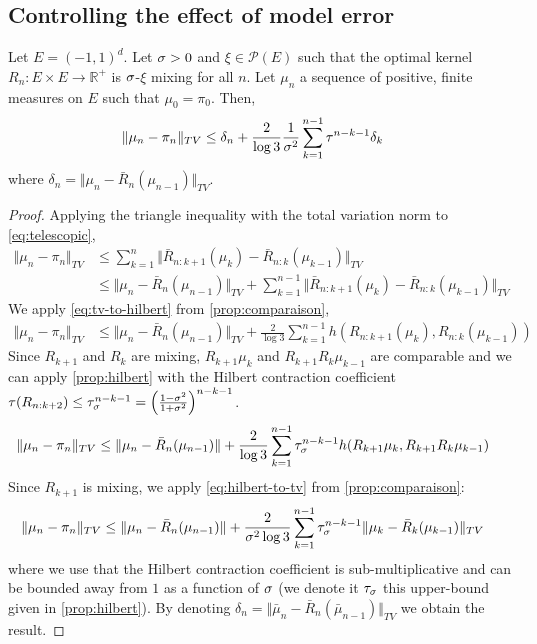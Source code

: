 \subsection{Controlling the effect of model error}\label{sec:proof-bound-model-error}
\begin{proposition}\label{prop:lemma_bound}
    Let $E = (-1, 1)^d$. Let $\sigma>0$ and $\xi\in\mathcal P(E)$ such that the optimal kernel $R_n:E\times E\to \mathbb R^+$ is $\sigma$-$\xi$ mixing for all $n$. Let $\mu_n$ a sequence of positive, finite measures on $E$ such that $\mu_0=\pi_0$. Then,
\begin{align}
    \Vert \mu_n - \pi_n \Vert_{TV} & \leq \delta_n + \frac{2}{\log 3}\frac{1}{\sigma^2}\sum_{k=1}^{n-1}\tau^{n-k-1}\delta_k
\end{align}
where $\delta_n = \Vert \mu_n - \bar R_n(\mu_{n-1})\Vert_{TV}$.
\end{proposition}

\begin{proof}
Applying the triangle inequality with the total variation norm to \cref{eq:telescopic},
\begin{align}
    \Vert \mu_n - \pi_n \Vert_{TV} &\leq \sum_{k=1}^n \Vert \bar R_{n:k+1}(\mu_k) - \bar R_{n:k}(\mu_{k-1}) \Vert_{TV} & \\
    & \leq \Vert \mu_n - \bar R_n(\mu_{n-1})\Vert_{TV} +\sum_{k=1}^{n-1} \Vert \bar R_{n:k+1}(\mu_k) - \bar R_{n:k}(\mu_{k-1}) \Vert_{TV} &
\end{align}
We apply \cref{eq:tv-to-hilbert} from \cref{prop:comparaison},
\begin{align}
    \Vert \mu_n - \pi_n \Vert_{TV}& \leq \Vert \mu_n - \bar R_n(\mu_{n-1})\Vert_{TV} + \frac{2}{\log 3}\sum_{k=1}^{n-1}h(R_{n:k+1}(\mu_k), R_{n:k}(\mu_{k-1}))
\end{align}
Since $R_{k+1}$ and $R_k$ are mixing, $R_{k+1}\mu_k$ and $R_{k+1}R_{k}\mu_{k-1}$ are comparable and we can apply \cref{prop:hilbert} with the Hilbert contraction coefficient $\tau(R_{n:k+2})\leq \tau_\sigma^{n-k-1}= \left(\frac{1-\sigma^2}{1+\sigma^2}\right)^{n-k-1}$.
\begin{align}
\Vert \mu_n - \pi_n \Vert_{TV}& \leq \Vert \mu_n - \bar R_n(\mu_{n-1})\Vert + \frac{2}{\log 3}\sum_{k=1}^{n-1}\tau_\sigma^{n-k-1}h(R_{k+1}\mu_k, R_{k+1}R_k\mu_{k-1})
\end{align}
Since $R_{k+1}$ is mixing, we apply \cref{eq:hilbert-to-tv} from \cref{prop:comparaison}:
\begin{align}
\Vert \mu_n - \pi_n \Vert_{TV}& \leq \Vert \mu_n - \bar R_n(\mu_{n-1})\Vert + \frac{2}{\sigma^2\log 3}\sum_{k=1}^{n-1}\tau_\sigma^{n-k-1}\Vert \mu_k - \bar R_{k}(\mu_{k-1})\Vert_{TV}
\end{align}
where we use that the Hilbert contraction coefficient is sub-multiplicative and can be bounded away from $1$ as a function of $\sigma$ (we denote it $\tau_\sigma$ this upper-bound given in \cref{prop:hilbert}). By denoting $\delta_n = \Vert \bar\mu_n - \bar{R}_n(\bar\mu_{n-1})\Vert_{TV}$ we obtain the result.
\end{proof}

